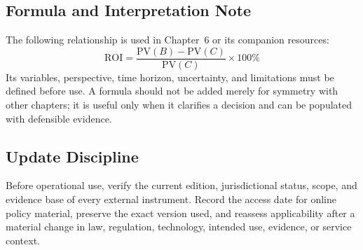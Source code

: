 \subsection{Formula and Interpretation Note}
The following relationship is used in Chapter~6 or its companion resources:
\begin{equation}
\mathrm{ROI}=\frac{\mathrm{PV}(B)-\mathrm{PV}(C)}{\mathrm{PV}(C)}\times100\%
\label{eq:comp-ch06-reference-formula}
\end{equation}
Its variables, perspective, time horizon, uncertainty, and limitations must be
defined before use. A formula should not be added merely for symmetry with other
chapters; it is useful only when it clarifies a decision and can be populated with
defensible evidence.

\subsection{Update Discipline}
Before operational use, verify the current edition, jurisdictional status, scope,
and evidence base of every external instrument. Record the access date for online
policy material, preserve the exact version used, and reassess applicability after a
material change in law, regulation, technology, intended use, evidence, or service
context.
